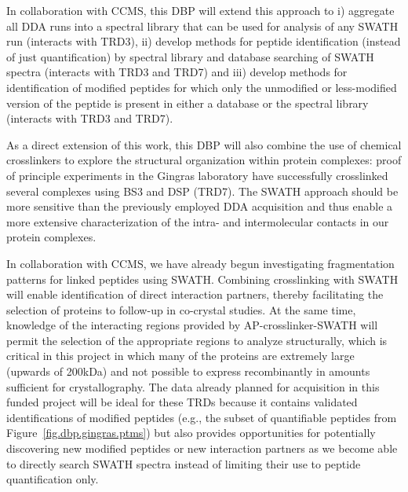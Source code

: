 \documentclass[arial,11pt]{article}
\begin{document}
In collaboration with CCMS, this DBP will extend this approach to i) aggregate all DDA runs into a spectral library that can be used for analysis of any SWATH run (interacts with TRD3), ii) develop methods for peptide identification (instead of just quantification) by spectral library and database searching of SWATH spectra (interacts with TRD3 and TRD7) and iii) develop methods for identification of modified peptides for which only the unmodified or less-modified version of the peptide is present in either a database or the spectral library (interacts with TRD3 and TRD7).

As a direct extension of this work, this DBP will also combine the use of chemical crosslinkers to explore the structural organization within protein complexes: proof of principle experiments in the Gingras laboratory have successfully crosslinked several complexes using BS3 and DSP (TRD7). The SWATH approach should be more sensitive than the previously employed DDA acquisition and thus enable a more extensive characterization of the intra- and intermolecular contacts in our protein complexes.

In collaboration with CCMS, we have already begun investigating fragmentation patterns for linked peptides using SWATH. Combining crosslinking with SWATH will enable identification of direct interaction partners, thereby facilitating the selection of proteins to follow-up in co-crystal studies. At the same time, knowledge of the interacting regions provided by AP-crosslinker-SWATH will permit the selection of the appropriate regions to analyze structurally, which is critical in this project in which many of the proteins are extremely large (upwards of 200kDa) and not possible to express recombinantly in amounts sufficient for crystallography. The data already planned for acquisition in this funded project will be ideal for these TRDs because it contains validated identifications of modified peptides (e.g., the subset of quantifiable peptides from Figure~\ref{fig.dbp.gingras.ptms}) but also provides opportunities for potentially discovering new modified peptides or new interaction partners as we become able to directly search SWATH spectra instead of limiting their use to peptide quantification only.
\end{document}
